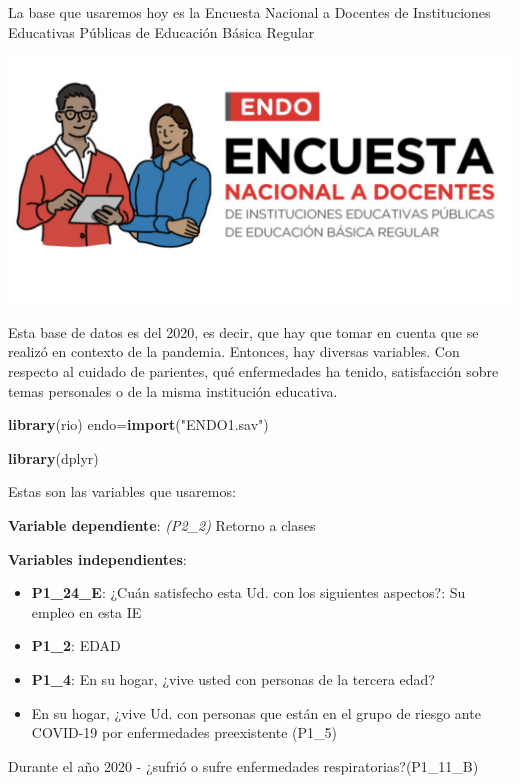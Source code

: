 \documentclass[
]{article}
\newenvironment{Shaded}{\begin{snugshade}}{\end{snugshade}}
\newcommand{\FunctionTok}[1]{\textcolor[rgb]{0.13,0.29,0.53}{\textbf{#1}}}
\newcommand{\NormalTok}[1]{#1}
\newcommand{\OtherTok}[1]{\textcolor[rgb]{0.56,0.35,0.01}{#1}}
\newcommand{\StringTok}[1]{\textcolor[rgb]{0.31,0.60,0.02}{#1}}
\begin{document}
La base que usaremos hoy es la Encuesta Nacional a Docentes de
Instituciones Educativas Públicas de Educación Básica Regular

\begin{center}\includegraphics[width=0.3\linewidth]{endo} \end{center}

Esta base de datos es del 2020, es decir, que hay que tomar en cuenta
que se realizó en contexto de la pandemia. Entonces, hay diversas
variables. Con respecto al cuidado de parientes, qué enfermedades ha
tenido, satisfacción sobre temas personales o de la misma institución
educativa.

\begin{Shaded}
\begin{Highlighting}[]
\FunctionTok{library}\NormalTok{(rio)}
\NormalTok{endo}\OtherTok{=}\FunctionTok{import}\NormalTok{(}\StringTok{"ENDO1.sav"}\NormalTok{)}
\end{Highlighting}
\end{Shaded}

\begin{Shaded}
\begin{Highlighting}[]
\FunctionTok{library}\NormalTok{(dplyr)}
\end{Highlighting}
\end{Shaded}

Estas son las variables que usaremos:

\textbf{Variable dependiente}: \emph{(P2\_2)} Retorno a clases

\textbf{Variables independientes}:

\begin{itemize}
\item
  \textbf{P1\_24\_E}: ¿Cuán satisfecho esta Ud. con los siguientes
  aspectos?: Su empleo en esta IE
\item
  \textbf{P1\_2}: EDAD
\item
  \textbf{P1\_4}: En su hogar, ¿vive usted con personas de la tercera
  edad?
\item
  En su hogar, ¿vive Ud. con personas que están en el grupo de riesgo
  ante COVID-19 por enfermedades preexistente (P1\_5)
\end{itemize}

Durante el año 2020 - ¿sufrió o sufre enfermedades
respiratorias?(P1\_11\_B)
\end{document}
